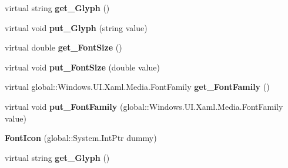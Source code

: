 \begin{DoxyCompactItemize}
\mbox{\label{class_windows_1_1_u_i_1_1_xaml_1_1_controls_1_1_font_icon_a5eed21875f8e0fd909a420f8ddf1d1a9}} 
virtual string {\bfseries get\+\_\+\+Glyph} ()
\item 
\mbox{\label{class_windows_1_1_u_i_1_1_xaml_1_1_controls_1_1_font_icon_adce42635121ffcf86756f04dc4002c0c}} 
virtual void {\bfseries put\+\_\+\+Glyph} (string value)
\item 
\mbox{\label{class_windows_1_1_u_i_1_1_xaml_1_1_controls_1_1_font_icon_a56c9091282a44095056b589c9e417ec8}} 
virtual double {\bfseries get\+\_\+\+Font\+Size} ()
\item 
\mbox{\label{class_windows_1_1_u_i_1_1_xaml_1_1_controls_1_1_font_icon_ab6e9c5d300ab27fe473978c6792a49a5}} 
virtual void {\bfseries put\+\_\+\+Font\+Size} (double value)
\item 
\mbox{\label{class_windows_1_1_u_i_1_1_xaml_1_1_controls_1_1_font_icon_a1ec67522af9017e450d6266855bc81d5}} 
virtual global\+::\+Windows.\+U\+I.\+Xaml.\+Media.\+Font\+Family {\bfseries get\+\_\+\+Font\+Family} ()
\item 
\mbox{\label{class_windows_1_1_u_i_1_1_xaml_1_1_controls_1_1_font_icon_a1f39590903627ddd712e1b20dba0c7ff}} 
virtual void {\bfseries put\+\_\+\+Font\+Family} (global\+::\+Windows.\+U\+I.\+Xaml.\+Media.\+Font\+Family value)
\item 
\mbox{\label{class_windows_1_1_u_i_1_1_xaml_1_1_controls_1_1_font_icon_a8416249e681423ded4616ce07522b6aa}} 
{\bfseries Font\+Icon} (global\+::\+System.\+Int\+Ptr dummy)
\item 
\mbox{\label{class_windows_1_1_u_i_1_1_xaml_1_1_controls_1_1_font_icon_a5eed21875f8e0fd909a420f8ddf1d1a9}} 
virtual string {\bfseries get\+\_\+\+Glyph} ()
\item 

\end{DoxyCompactItemize}
